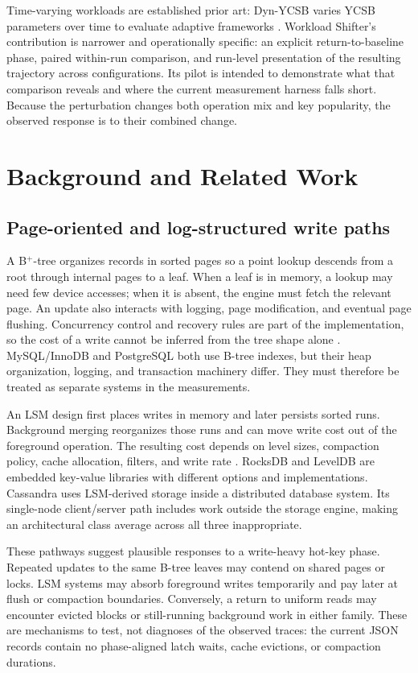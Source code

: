 \documentclass[10pt]{article}
\begin{document}
Time-varying workloads are established prior art: Dyn-YCSB varies YCSB parameters over time to evaluate adaptive frameworks \cite{sidhanta2019}. Workload Shifter's contribution is narrower and operationally specific: an explicit return-to-baseline phase, paired within-run comparison, and run-level presentation of the resulting trajectory across configurations. Its pilot is intended to demonstrate what that comparison reveals and where the current measurement harness falls short. Because the perturbation changes both operation mix and key popularity, the observed response is to their combined change.

\section{Background and Related Work}
\label{sec:background}
\subsection{Page-oriented and log-structured write paths}
A B$^+$-tree organizes records in sorted pages so a point lookup descends from a root through internal pages to a leaf. When a leaf is in memory, a lookup may need few device accesses; when it is absent, the engine must fetch the relevant page. An update also interacts with logging, page modification, and eventual page flushing. Concurrency control and recovery rules are part of the implementation, so the cost of a write cannot be inferred from the tree shape alone \cite{graefe2010,innodb}. MySQL/InnoDB and PostgreSQL both use B-tree indexes, but their heap organization, logging, and transaction machinery differ. They must therefore be treated as separate systems in the measurements.

An LSM design first places writes in memory and later persists sorted runs. Background merging reorganizes those runs and can move write cost out of the foreground operation. The resulting cost depends on level sizes, compaction policy, cache allocation, filters, and write rate \cite{oneil1996,luo2020}. RocksDB and LevelDB are embedded key-value libraries with different options and implementations. Cassandra uses LSM-derived storage inside a distributed database system. Its single-node client/server path includes work outside the storage engine, making an architectural class average across all three inappropriate.

These pathways suggest plausible responses to a write-heavy hot-key phase. Repeated updates to the same B-tree leaves may contend on shared pages or locks. LSM systems may absorb foreground writes temporarily and pay later at flush or compaction boundaries. Conversely, a return to uniform reads may encounter evicted blocks or still-running background work in either family. These are mechanisms to test, not diagnoses of the observed traces: the current JSON records contain no phase-aligned latch waits, cache evictions, or compaction durations.
\end{document}
